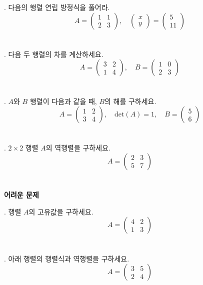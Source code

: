 \documentclass[fleqn]{article}
\begin{document}
. 다음의 행렬 연립 방정식을 풀어라.
\[
A = \begin{pmatrix}
1 & 1 \\
2 & 3
\end{pmatrix}, \quad \begin{pmatrix}
x \\
y
\end{pmatrix} = \begin{pmatrix}
5 \\
11
\end{pmatrix}
\]
\ \\\\

. 다음 두 행렬의 차를 계산하세요.
\[
A = \begin{pmatrix}
3 & 2 \\
1 & 4
\end{pmatrix}, \quad B = \begin{pmatrix}
1 & 0 \\
2 & 3
\end{pmatrix}
\]
\ \\\\

. \(A\)와 \(B\) 행렬이 다음과 같을 때, \(B\)의 해를 구하세요.
\[
A = \begin{pmatrix}
1 & 2 \\
3 & 4
\end{pmatrix}, \quad \text{det}(A) = 1, \quad B = \begin{pmatrix}
5 \\
6
\end{pmatrix}
\]
\ \\\\

. \(2 \times 2\) 행렬 \(A\)의 역행렬을 구하세요. 
\[
A = \begin{pmatrix}
2 & 3 \\
5 & 7
\end{pmatrix}
\]
\ \\\\

\textbf{어려운 문제}

. 행렬 \(A\)의 고유값을 구하세요.
\[
A = \begin{pmatrix}
4 & 2 \\
1 & 3
\end{pmatrix}
\]
\ \\\\

. 아래 행렬의 행렬식과 역행렬을 구하세요.
\[
A = \begin{pmatrix}
3 & 5 \\
2 & 4
\end{pmatrix}
\]
\ \\\\
\end{document}
